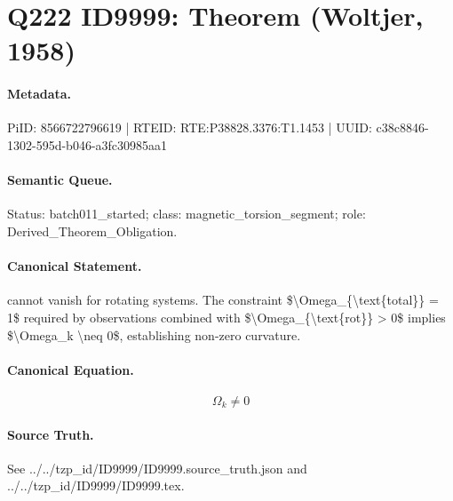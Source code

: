 \section*{Q222 ID9999: Theorem (Woltjer, 1958)}
\paragraph{Metadata.}
PiID: 8566722796619 | RTEID: RTE:P38828.3376:T1.1453 | UUID: c38c8846-1302-595d-b046-a3fc30985aa1

\paragraph{Semantic Queue.}
Status: batch011\_started; class: magnetic\_torsion\_segment; role: Derived\_Theorem\_Obligation.

\paragraph{Canonical Statement.}
cannot vanish for rotating systems. The constraint \$\textbackslash{}Omega\_\{\textbackslash{}text\{total\}\} = 1\$ required by observations combined with \$\textbackslash{}Omega\_\{\textbackslash{}text\{rot\}\} > 0\$ implies \$\textbackslash{}Omega\_k \textbackslash{}neq 0\$, establishing non-zero curvature.

\paragraph{Canonical Equation.}
\[
\Omega_k \neq 0
\]

\paragraph{Source Truth.}
See ../../tzp\_id/ID9999/ID9999.source\_truth.json and ../../tzp\_id/ID9999/ID9999.tex.
